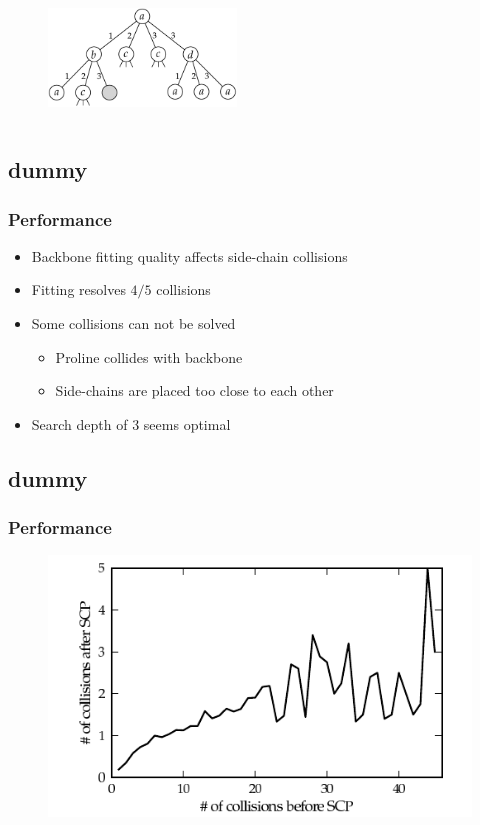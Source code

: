 \documentclass{beamer}
\begin{document}
\begin{frame}
\begin{columns}[c]
	
	\column{5cm}
	\begin{figure}
		\includegraphics[width=5cm]{../rapport/figures/rotamersearch.pdf}
	\end{figure}
	
	\end{columns}
\end{frame}

\subsection{dummy}
\begin{frame}
	\frametitle{Performance}
	
	\begin{itemize}
		\item Backbone fitting quality affects side-chain collisions
		\item Fitting resolves $4/5$ collisions
		\item Some collisions can not be solved
		\begin{itemize}
			\item Proline collides with backbone
			\item Side-chains are placed too close to each other
		\end{itemize}
		\item Search depth of 3 seems optimal
	\end{itemize}
	
\end{frame}

\subsection{dummy}
\begin{frame}
	\frametitle{Performance}
	
	\begin{figure}
		\centering
		\includegraphics[width=.75\columnwidth]{../rapport/figures/plot_scp}
	\end{figure}
	
\end{frame}
\end{document}
